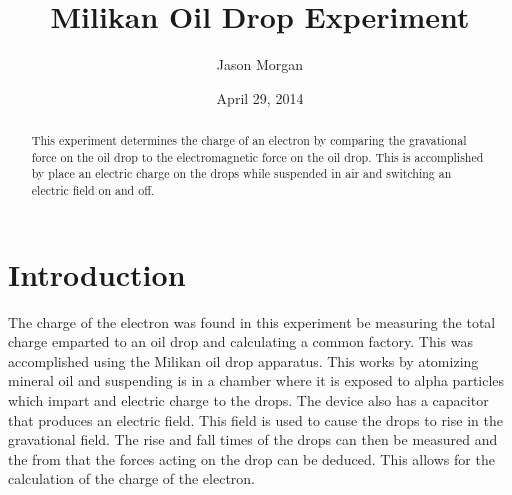 \documentclass[twocolumn,secnumarabic,amssymb, nobibnotes, aps, pra]{revtex4}
\begin{document}
\title{Milikan Oil Drop Experiment
 }


\author{Jason Morgan}

\date{April 29, 2014}

\begin{abstract}
This experiment determines the charge of an electron by comparing the gravational force on the oil drop to the electromagnetic force on the oil drop. This is accomplished by place an electric charge on the drops while suspended in air and switching an electric field on and off.
\end{abstract}

\maketitle
\section{Introduction}

The charge of the electron was found in this experiment be measuring the total charge emparted to an oil drop and calculating a common factory.  This was accomplished using the Milikan oil drop apparatus.  This works by atomizing mineral oil and suspending is in a chamber where it is exposed to alpha particles which impart and electric charge to the drops.  The device also has a capacitor that produces an electric field.  This field is used to cause the drops to rise in the gravational field.  The rise and fall times of the drops can then be measured and the from that the forces acting on the drop can be deduced.  This allows for the calculation of the charge of the electron.
\end{document}
